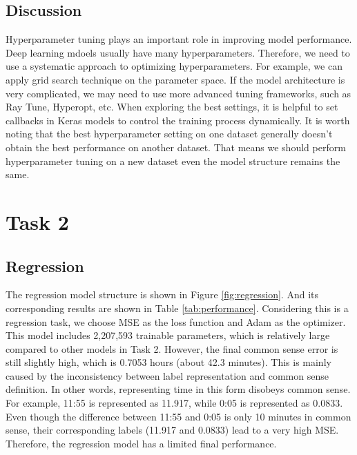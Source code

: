 \documentclass{article}
\begin{document}
\subsection{Discussion}
Hyperparameter tuning plays an important role in improving model performance. Deep learning mdoels usually have many hyperparameters. Therefore, we need to use a systematic approach to optimizing hyperparameters. For example, we can apply grid search technique on the parameter space. If the model architecture is very complicated, we may need to use more advanced tuning frameworks, such as Ray Tune, Hyperopt, etc. When exploring the best settings, it is helpful to set callbacks in Keras models to control the training process dynamically. It is worth noting that the best hyperparameter setting on one dataset generally doesn't obtain the best performance on another dataset. That means we should perform hyperparameter tuning on a new dataset even the model structure remains the same.

\section*{Task 2}
\setcounter{section}{2}
\setcounter{subsection}{0}
\subsection{Regression}
The regression model structure is shown in Figure \ref{fig:regression}. And its corresponding results are shown in Table \ref{tab:performance}. Considering this is a regression task, we choose MSE as the loss function and Adam as the optimizer. This model includes 2,207,593 trainable parameters, which is relatively large compared to other models in Task 2. However, the final common sense error is still slightly high, which is 0.7053 hours (about 42.3 minutes). This is mainly caused by the inconsistency between label representation and common sense definition. In other words, representing time in this form disobeys common sense. For example, 11:55 is represented as 11.917, while 0:05 is represented as 0.0833. Even though the difference between 11:55 and 0:05 is only 10 minutes in common sense, their corresponding labels (11.917 and 0.0833) lead to a very high MSE. Therefore, the regression model has a limited final performance.
\end{document}
